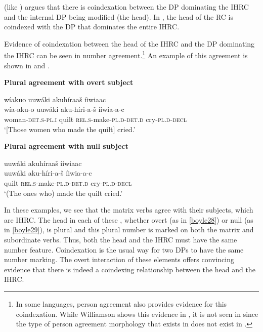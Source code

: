 \documentclass[output=paper]{LSP/langsci}
\begin{document}
\citeauthor{Culy1990} (like \citeauthor{Williamson1987}) argues that there is coindexation between the DP dominating the IHRC and the internal DP being modified (the head). In , the head of the RC is coindexed with the DP that dominates the entire IHRC. 
	
Evidence of coindexation between the head of the IHRC and the DP dominating the IHRC can be seen in number agreement.\footnote{In some languages, person agreement also provides evidence for this coindexation. While Williamson shows this evidence in , it is not seen in  since the type of person agreement morphology that exists in  does not exist in .}  An example of this agreement is shown in  and .

\ea \textbf{Plural agreement with overt subject} \label{boyle28}

\glll w\'iakuo uuwáki akuh\'iraa\v{s} \'iiwiaac\\
w\'ia-aku-o  uuwáki aku-h\'iri-a-\v{s}    \'iiwia-a-c\\
woman-\textsc{det.s-pl.i}  quilt  \textsc{rel.s}-make-\textsc{pl.d-det.d} cry-\textsc{pl.d-decl}\\
\trans `[Those women who made the quilt] cried.'
\z

\ea \textbf{Plural agreement with null subject} \label{boyle29}

\glll uuwáki akuh\'iraa\v{s} \'iiwiaac\\
uuwáki aku-h\'iri-a-\v{s}   \'iiwia-a-c\\
quilt     \textsc{rel.s}-make-\textsc{pl.d}-\textsc{det.d} cry-\textsc{pl.d-decl}\\
\trans `(The ones who) made the quilt cried.'	
\z

In these examples, we see that the matrix verbs agree with their subjects, which are IHRC. The head in each of these , whether overt (as in \ref{boyle28}) or null (as in \ref{boyle29}), is plural and this plural number is marked on both the matrix and subordinate verbs. Thus, both the head and the IHRC must have the same number feature. Coindexation is the usual way for two DPs to have the same number marking. The overt interaction of these elements offers convincing evidence that there is indeed a coindexing relationship between the head and the IHRC.  
	
\end{document}

